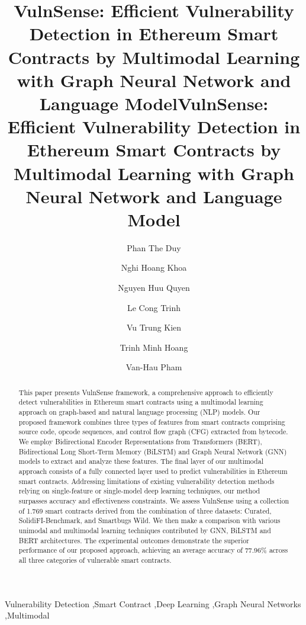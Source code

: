 \title{VulnSense: Efficient Vulnerability Detection in Ethereum Smart Contracts by Multimodal Learning with Graph Neural Network and Language Model}



\begin{frontmatter}

\title{VulnSense: Efficient Vulnerability Detection in Ethereum Smart Contracts by Multimodal Learning with Graph Neural Network and Language Model}

\author[inst1,inst2]{Phan The Duy}
\author[inst1,inst2]{Nghi Hoang Khoa}
\author[inst1,inst2]{Nguyen Huu Quyen}
\author[inst1,inst2]{Le Cong Trinh}
\author[inst1,inst2]{Vu Trung Kien}
\author[inst1,inst2]{Trinh Minh Hoang}
\author[inst1,inst2]{Van-Hau Pham}



\begin{abstract}
This paper presents VulnSense framework, a comprehensive approach to efficiently detect vulnerabilities in Ethereum smart contracts using a multimodal learning approach on graph-based and natural language processing (NLP) models. Our proposed framework combines three types of features from smart contracts comprising source code, opcode sequences, and control flow graph (CFG) extracted from bytecode. We employ Bidirectional Encoder Representations from Transformers (BERT), Bidirectional Long Short-Term Memory (BiLSTM) and Graph Neural Network (GNN) models to extract and analyze these features. The final layer of our multimodal approach consists of a fully connected layer used to predict vulnerabilities in Ethereum smart contracts. Addressing limitations of existing vulnerability detection methods relying on single-feature or single-model deep learning techniques, our method surpasses accuracy and effectiveness constraints. We assess VulnSense using a collection of 1.769 smart contracts derived from the combination of three datasets: Curated, SolidiFI-Benchmark, and Smartbugs Wild. We then make a comparison with various unimodal and multimodal learning techniques contributed by GNN, BiLSTM and BERT architectures. The experimental outcomes demonstrate the superior performance of our proposed approach, achieving an average accuracy of 77.96\% across all three categories of vulnerable smart contracts.
\end{abstract}

\begin{keyword}
Vulnerability Detection \sep Smart Contract \sep Deep Learning \sep Graph Neural Networks \sep Multimodal
\end{keyword}

\end{frontmatter}

